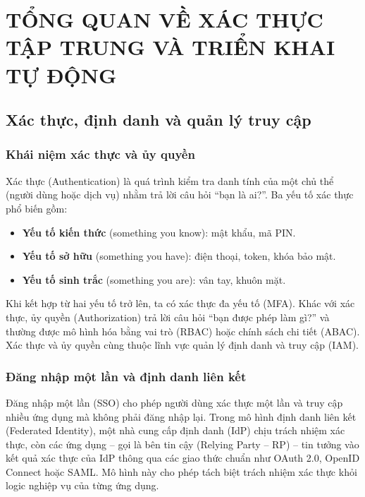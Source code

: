 \chapter{TỔNG QUAN VỀ XÁC THỰC TẬP TRUNG VÀ TRIỂN KHAI TỰ ĐỘNG}
\label{ch:tongquan}

\section{Xác thực, định danh và quản lý truy cập}
\label{sec:iam}

\subsection{Khái niệm xác thực và ủy quyền}

Xác thực (Authentication) là quá trình kiểm tra danh tính của một chủ
thể (người dùng hoặc dịch vụ) nhằm trả lời câu hỏi ``bạn là ai?''. Ba yếu tố
xác thực phổ biến gồm:
\begin{itemize}
  \item \textbf{Yếu tố kiến thức} (something you know): mật khẩu, mã PIN.
  \item \textbf{Yếu tố sở hữu} (something you have): điện thoại, token, khóa
  bảo mật.
  \item \textbf{Yếu tố sinh trắc} (something you are): vân tay, khuôn mặt.
\end{itemize}

Khi kết hợp từ hai yếu tố trở lên, ta có xác thực đa yếu tố (MFA).
Khác với xác thực, ủy quyền (Authorization) trả lời câu hỏi ``bạn được
phép làm gì?'' và thường được mô hình hóa bằng vai trò (RBAC) hoặc chính sách
chi tiết (ABAC). Xác thực và ủy quyền cùng thuộc lĩnh vực quản lý định danh và truy cập (IAM).

\subsection{Đăng nhập một lần và định danh liên kết}

Đăng nhập một lần (SSO) cho phép người dùng xác thực một lần và truy
cập nhiều ứng dụng mà không phải đăng nhập lại. Trong mô hình
định danh liên kết (Federated Identity), một nhà cung cấp định danh (IdP) chịu trách nhiệm xác thực, còn các ứng dụng -- gọi là
bên tin cậy (Relying Party -- RP) -- tin tưởng vào kết quả xác thực của
IdP thông qua các giao thức chuẩn như OAuth 2.0, OpenID Connect hoặc SAML.
Mô hình này cho phép tách biệt trách nhiệm xác thực khỏi logic nghiệp vụ của
từng ứng dụng.

